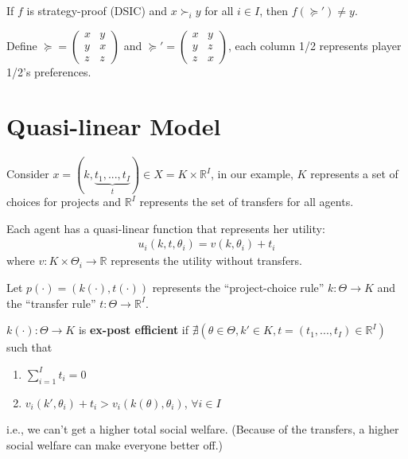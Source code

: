 \documentclass[11pt]{elegantbook}
\begin{document}
\begin{lemma}
    If $f$ is strategy-proof (DSIC) and $x\succ_i y$ for all $i\in I$, then $f(\succeq')\neq y$.
\end{lemma}

\begin{example}
    Define $\succeq=\begin{pmatrix}
        x&y\\
        y&x\\
        z&z
    \end{pmatrix}$ and $\succeq'=\begin{pmatrix}
        x&y\\
        y&z\\
        z&x
    \end{pmatrix}$, each column 1/2 represents player 1/2's preferences.
\end{example}



\section{Quasi-linear Model}
Consider $x=(k,\underbrace{t_1,...,t_I}_{t})\in X=K\times \mathbb{R}^I$, in our example, $K$ represents a set of choices for projects and $\mathbb{R}^I$ represents the set of transfers for all agents.

Each agent has a quasi-linear function that represents her utility:
\begin{equation}
    \begin{aligned}
        u_i(k,t,\theta_i)=v(k,\theta_i)+t_i
    \end{aligned}
    \nonumber
\end{equation}
where $v: K\times\Theta_i \rightarrow \mathbb{R}$ represents the utility without transfers.

Let $p(\cdot)=\left(k(\cdot),t(\cdot)\right)$ represents the ``project-choice rule'' $k: \Theta \rightarrow K$ and the ``transfer rule'' $t: \Theta \rightarrow \mathbb{R}^I$.
\begin{definition}
    \normalfont
    $k(\cdot):\Theta \rightarrow K$ is \textbf{ex-post efficient} if $\nexists \left(\theta\in\Theta, k'\in K, t=(t_1,...,t_I)\in \mathbb{R}^I\right)$ such that
    \begin{enumerate}[(1).]
        \item $\sum_{i=1}^I t_i=0$
        \item $v_i(k',\theta_i)+t_i> v_i(k(\theta),\theta_i)$, $\forall i\in I$
    \end{enumerate}
    i.e., we can't get a higher total social welfare. (Because of the transfers, a higher social welfare can make everyone better off.)
\end{definition}
\end{document}
